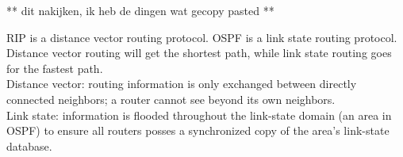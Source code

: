** dit nakijken, ik heb de dingen wat gecopy pasted **

RIP is a distance vector routing protocol. OSPF is a link state routing protocol. \\
Distance vector routing will get the shortest path, while link state routing goes for the fastest path. \\

Distance vector: routing information is only exchanged between directly connected neighbors; a router cannot see beyond its own neighbors. \\
Link state: information is flooded throughout the link-state domain (an area in OSPF) to ensure all routers posses a synchronized copy of the area's link-state database.


